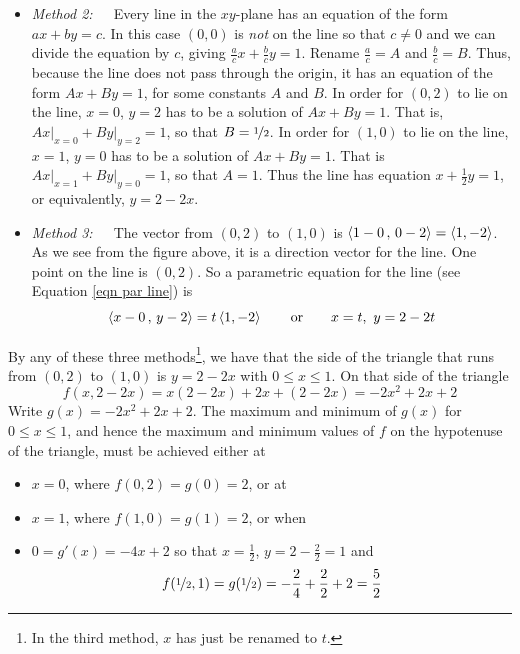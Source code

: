 \begin{eg}
\begin{itemize}
\begin{itemize}
\item 
 \emph{Method 2:}\ \ \  Every line in the $xy$-plane has an equation 
of the form $ax+by=c$. In this case $(0,0)$ is \emph{not} on the line so
that $c\ne 0$ and we can divide the equation by $c$, giving
$\frac{a}{c}x+\frac{b}{c}y=1$. Rename $\frac{a}{c}=A$ and $\frac{b}{c}=B$. Thus, because the line does not pass through the origin,
it has an equation of the form $Ax+By=1$, for some constants $A$ and $B$.
In order for $(0,2)$ to lie on the line, $x=0$, $y=2$ has to be a solution of 
$Ax+By=1$. That is, $Ax\big|_{x=0}+By\big|_{y=2}=1$, 
so that $B=\nicefrac{1}{2}$.  
In order for $(1,0)$ to lie on the line, $x=1$, $y=0$ has to be a solution of 
$Ax+By=1$. That is $Ax\big|_{x=1}+By\big|_{y=0}=1$, so that $A=1$. Thus the line has equation
$x+\frac{1}{2}y=1$, or equivalently, $y=2-2x$. 

\item
 \emph{Method 3:}\ \ \ The vector from 
$(0,2)$ to $(1,0)$ is $\left< 1-0\,,\,0-2\right> = \left< 1,-2\right>$. 
As we see from the figure above, it is a direction vector for the line. One point on the line is $(0,2)$. So a parametric equation for the line 
(see Equation \ref{eqn par line}) is
\begin{equation*}
\left< x-0\,,\,y-2\right> = t\left< 1,-2\right>\qquad\text{or}\qquad
x=t,\ y=2-2t
\end{equation*}
\end{itemize}
By any of these three methods\footnote{In the third method, $x$ has just be renamed to $t$.}, we have that the side of the triangle that 
runs from $(0,2)$ to $(1,0)$ is $y=2-2x$ with $0\le x\le 1$. On that side of the triangle
\begin{equation*}
f(x,2-2x) = x(2-2x)+2x+(2-2x)
          = -2x^2 +2x+2
\end{equation*}
Write $g(x) = -2x^2 +2x+2$. The maximum and minimum of $g(x)$ for 
$0\le x\le 1$, and hence the maximum and minimum values of $f$ on the hypotenuse of the triangle, must be achieved either at
\begin{itemize}\itemsep1pt \parskip0pt 
\item $x=0$, where $f(0,2)=g(0)=2$, or at 
\item $x=1$, where $f(1,0)=g(1)=2$, or when
\item $0=g'(x) = -4x+2$ so that $x=\frac{1}{2}$, $y=2-\frac{2}{2}=1$ and 
\begin{equation*}
f(\nicefrac{1}{2},1)=g(\nicefrac{1}{2})=-\frac{2}{4}+\frac{2}{2}+2
       =\frac{5}{2}
\end{equation*}
\end{itemize} 


\end{itemize}
\end{eg}
